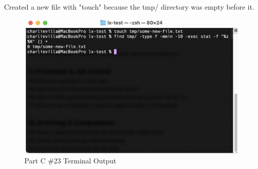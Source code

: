 \begin{itemize}
    Created a new file with "touch" because the tmp/ directory was empty before it.

    \begin{figure}[H]
        \centering
        \includegraphics[width=12cm, height=7cm]{png/LinuxProblemSetPicsPNG/part_e_23.png}
        \caption{Part C \#23 Terminal Output}
        \label{fig:partC 23}
    \end{figure}  
\end{itemize}


